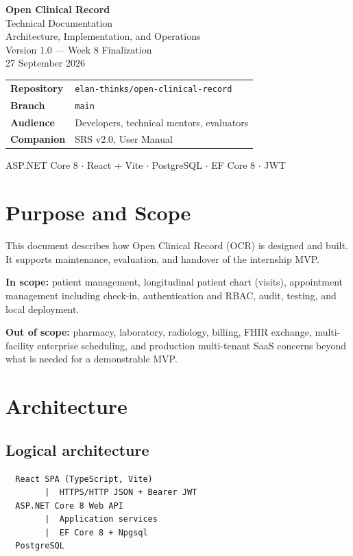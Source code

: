 \documentclass[11pt,a4paper]{article}
\begin{document}
\begin{titlepage}
\centering
\vspace*{1.5cm}
{\LARGE\bfseries Open Clinical Record}\\[0.4cm]
{\Large Technical Documentation}\\[1.0cm]
{\large Architecture, Implementation, and Operations}\\[0.4cm]
{\large Version 1.0 --- Week 8 Finalization}\\[0.4cm]
{\large 27 September 2026}\\[1.5cm]
\begin{tabular}{ll}
\toprule
\textbf{Repository} & \texttt{elan-thinks/open-clinical-record} \\
\textbf{Branch} & \texttt{main} \\
\textbf{Audience} & Developers, technical mentors, evaluators \\
\textbf{Companion} & SRS v2.0, User Manual \\
\bottomrule
\end{tabular}
\vfill
{\small ASP.NET Core 8 $\cdot$ React + Vite $\cdot$ PostgreSQL $\cdot$ EF Core 8 $\cdot$ JWT}
\end{titlepage}

\tableofcontents
\newpage

\section{Purpose and Scope}

This document describes how Open Clinical Record (OCR) is designed and built. It supports maintenance, evaluation, and handover of the internship MVP.

\textbf{In scope:} patient management, longitudinal patient chart (visits), appointment management including check-in, authentication and RBAC, audit, testing, and local deployment.

\textbf{Out of scope:} pharmacy, laboratory, radiology, billing, FHIR exchange, multi-facility enterprise scheduling, and production multi-tenant SaaS concerns beyond what is needed for a demonstrable MVP.

\section{Architecture}

\subsection{Logical architecture}
\begin{verbatim}
  React SPA (TypeScript, Vite)
        |  HTTPS/HTTP JSON + Bearer JWT
  ASP.NET Core 8 Web API
        |  Application services
        |  EF Core 8 + Npgsql
  PostgreSQL
\end{verbatim}
\end{document}
